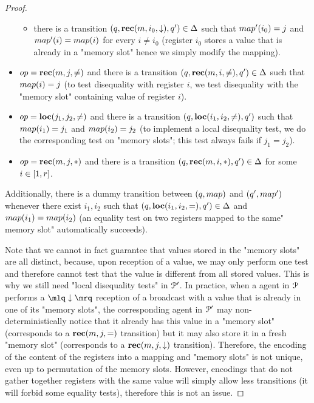 \begin{proof}
\begin{itemize}
\begin{itemize}
			\item there is a transition $(q, \textbf{rec}(m, i_0, \downarrow), q') \in \Delta$ such that $\map'(i_0)=j$ and $\map'(i) = \map(i)$ for every $i \neq i_0$ (register $i_0$ stores a value that is already in a "memory slot" hence we simply modify the mapping).
		\end{itemize} 
		
		\item $\op = \rec{m}{j}{\diseqtestact}$ and there is a transition $(q, \textbf{rec}(m, i, {\ne}), q') \in \Delta$ such that $\map(i)=j$ (to test disequality with register $i$, we test disequality with the "memory slot" containing value of register $i$).
		

		\item $\op=\loc{j_1}{j_2}{\diseqtestact}$ and there is a transition $(q, \textbf{loc}(i_1,i_2,{\ne}), q')$ such that $\map(i_1)=j_1$ and $\map(i_2) = j_2$ (to implement a local disequality test, we do the corresponding test on "memory slots"; this test always fails if $j_1 = j_2$).
		
		
		\item $\op = \rec{m}{j}{\dummyact}$ and there is a transition $(q, \textbf{rec}(m, i, {*}), q') \in \Delta$ for some $i \in [1,r]$.
	\end{itemize}
	
	Additionally, there is a dummy transition between $(q,\map)$ and $(q',\map')$ whenever there exist $i_1, i_2$ such that $(q, \textbf{loc}(i_1,i_2,{=}), q') \in \Delta$ and $\map(i_1) = \map(i_2)$ (an equality test on two registers mapped to the same" memory slot" automatically succeeds).

	Note that we cannot in fact guarantee that values stored in the "memory slots" are all distinct, because, upon reception of a value, we may only perform one test and therefore cannot test that the value is different from all stored values. This is why we still need "local disequality tests" in $\mathcal{P}'$. In practice, when a agent in $\mathcal{P}$ performs a $\quotemarks{\enregact}$ reception of a broadcast with a value that is already in one of its "memory slots", the corresponding agent in $\mathcal{P}'$ may non-deterministically notice that it already has this value in a "memory slot" (corresponds to a $\textbf{rec}(m, j, {=})$ transition) but it may also store it in a fresh "memory slot" (corresponds to a $\textbf{rec}(m, j, \downarrow)$ transition). Therefore, the encoding of the content of the registers into a mapping and "memory slots" is not unique, even up to permutation of the memory slots. However, encodings that do not gather together registers with the same value will simply allow less transitions (it will forbid some equality tests), therefore this is not an issue. 


\end{proof}
